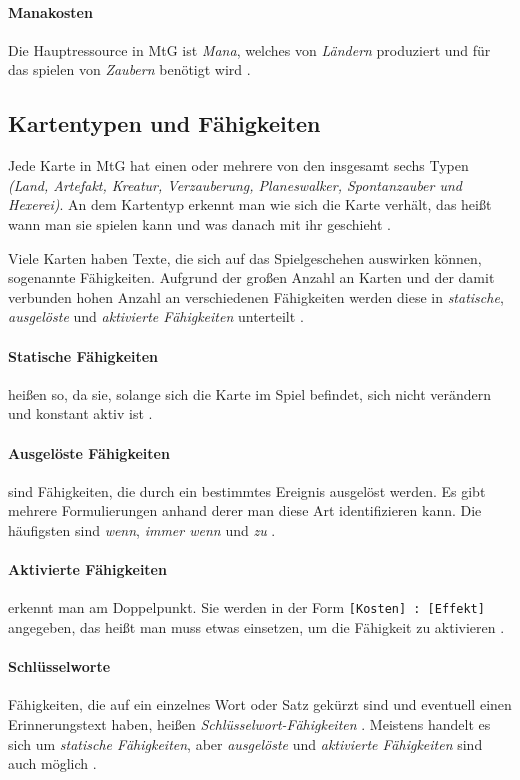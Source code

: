 \paragraph{Manakosten}
Die Hauptressource in \ac{MtG} ist \emph{Mana}, welches von \emph{Ländern} produziert und für das spielen von \emph{Zaubern} benötigt wird \cite{rulebook:2013}. 

\subsection{Kartentypen und Fähigkeiten}
Jede Karte in \ac{MtG} hat einen oder mehrere von den insgesamt sechs Typen \emph{(Land, Artefakt, Kreatur, Verzauberung, Planeswalker, Spontanzauber und Hexerei)}. An dem Kartentyp erkennt man wie sich die Karte verhält, das heißt wann man sie spielen kann und was danach mit ihr geschieht \cite{rulebook:2013}.

Viele Karten haben Texte, die sich auf das Spielgeschehen auswirken können, sogenannte Fähigkeiten. Aufgrund der großen Anzahl an Karten und der damit verbunden hohen Anzahl an verschiedenen Fähigkeiten werden diese in \emph{statische}, \emph{ausgelöste} und \emph{aktivierte Fähigkeiten} unterteilt \cite{rulebook:2013}.

\paragraph{Statische Fähigkeiten}
heißen so, da sie, solange sich die Karte im Spiel befindet, sich nicht verändern und konstant aktiv ist \cite{rulebook:2013}.

\paragraph{Ausgelöste Fähigkeiten}
sind Fähigkeiten, die durch ein bestimmtes Ereignis ausgelöst werden. Es gibt mehrere Formulierungen anhand derer man diese Art identifizieren kann. Die häufigsten sind \emph{wenn}, \emph{immer wenn} und \emph{zu} \cite{rulebook:2013}.

\paragraph{Aktivierte Fähigkeiten}
 erkennt man am Doppelpunkt. Sie werden in der Form \verb|[Kosten] : [Effekt]| angegeben, das heißt man muss etwas einsetzen, um die Fähigkeit zu aktivieren \cite{rulebook:2013}.

\paragraph{Schlüsselworte}
Fähigkeiten, die auf ein einzelnes Wort oder Satz gekürzt sind und eventuell einen Erinnerungstext haben, heißen \emph{Schlüsselwort-Fähigkeiten} \cite{rulebook:2013}. Meistens handelt es sich um \emph{statische Fähigkeiten}, aber \emph{ausgelöste} und \emph{aktivierte Fähigkeiten} sind auch möglich \cite{rulebook:2013}.

